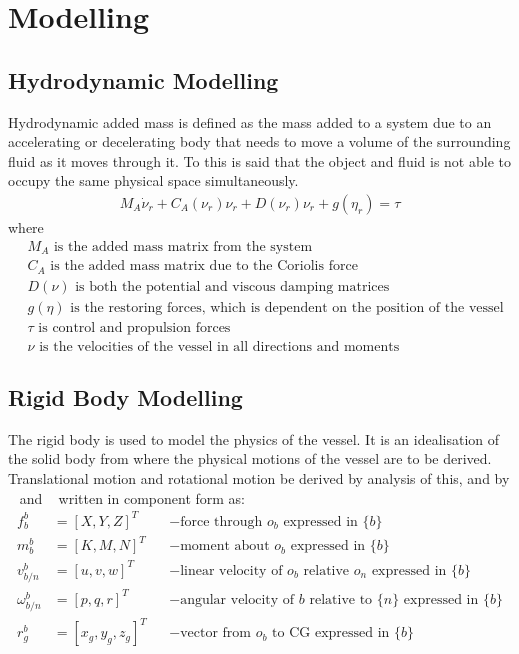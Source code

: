 \chapter{Modelling}
\label{ch:modelling}

\section{Hydrodynamic Modelling}
Hydrodynamic added mass is defined as the mass added to a system due to an accelerating or decelerating body that needs to move a volume of the surrounding fluid as it moves through it. To this is said that the object and fluid is not able to occupy the same physical space simultaneously.
\begin{align}
M_A \dot \nu_r + C_A(\nu_r)\nu_r + D(\nu_r)\nu_r + g(\eta_r) = \tau
\label{eq:hydmodel}
\end{align}
where
\begin{align}
&M_A \text{ is the added mass matrix from the system}\nonumber\\
&C_A \text{ is the added mass matrix due to the Coriolis force}\nonumber\\
&D(\nu) \text{ is both the potential and viscous damping matrices}\nonumber\\
&g(\eta) \text{ is the restoring forces, which is dependent on the position of the vessel}\nonumber\\
&\tau \text{ is control and propulsion forces}\nonumber\\
&\nu \text{ is the velocities of the vessel in all directions and moments}
\end{align}

\section{Rigid Body Modelling}
The rigid body is used to model the physics of the vessel. It is an idealisation of the solid body from where the physical motions of the vessel are to be derived. Translational motion and rotational motion be derived by analysis of this, and by ~\citep{sname1950} and ~\citep[sec. (3.3.1)]{fossen} written in component form as:
\begin{align}
f^b_b &= [X,Y,Z]^T & &- \text{force through } o_b \text{ expressed in } \{b\}\\
m^b_b &= [K,M,N]^T & &- \text{moment about } o_b \text{ expressed in } \{b\}\\
v^b_{b/n} &= [u,v,w]^T & &- \text{linear velocity of } o_b \text{ relative } o_n \text{ expressed in } \{b\}\\
\omega^b_{b/n} &= [p,q,r]^T & &- \text{angular velocity of } {b} \text{ relative to } \{n\} \text{ expressed in } \{b\}\\
r^b_g &= [x_g,y_g,z_g]^T & &- \text{vector from } o_b \text{ to CG expressed in } \{b\}
\end{align}

